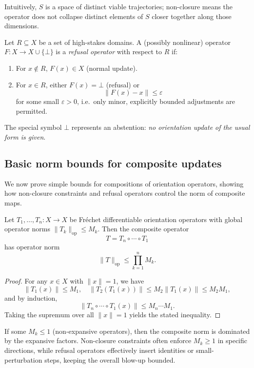 \documentclass[11pt]{article}
\begin{document}
Intuitively, \(S\) is a space of distinct viable trajectories; non-closure means the operator does not collapse distinct elements of \(S\) closer together along those dimensions.

\begin{definition}
Let \(R \subseteq X\) be a set of high-stakes domains. A (possibly nonlinear) operator \(F : X \to X \cup \{\bot\}\) is a \emph{refusal operator} with respect to \(R\) if:
\begin{enumerate}
  \item For \(x \notin R\), \(F(x) \in X\) (normal update).
  \item For \(x \in R\), either \(F(x) = \bot\) (refusal) or
  \[
  \|F(x) - x\| \le \varepsilon
  \]
  for some small \(\varepsilon > 0\), i.e.\ only minor, explicitly bounded adjustments are permitted.
\end{enumerate}
\end{definition}

The special symbol \(\bot\) represents an abstention: \emph{no orientation update of the usual form is given}.

\subsection{Basic norm bounds for composite updates}

We now prove simple bounds for compositions of orientation operators, showing how non-closure constraints and refusal operators control the norm of composite maps.

\begin{proposition}
Let \(T_1,\dots,T_n : X \to X\) be Fréchet differentiable orientation operators with global operator norms \(\|T_k\|_{\mathrm{op}} \le M_k\). Then the composite operator
\[
T = T_n \circ \cdots \circ T_1
\]
has operator norm
\[
\|T\|_{\mathrm{op}} \le \prod_{k=1}^n M_k.
\]
\end{proposition}

\begin{proof}
For any \(x \in X\) with \(\|x\| = 1\), we have
\[
\|T_1(x)\| \le M_1,\quad \|T_2(T_1(x))\| \le M_2 \|T_1(x)\| \le M_2 M_1,
\]
and by induction,
\[
\|T_n \circ \cdots \circ T_1(x)\| \le M_n \cdots M_1.
\]
Taking the supremum over all \(\|x\| = 1\) yields the stated inequality.
\end{proof}

If some \(M_k \le 1\) (non-expansive operators), then the composite norm is dominated by the expansive factors. Non-closure constraints often enforce \(M_k \ge 1\) in specific directions, while refusal operators effectively insert identities or small-perturbation steps, keeping the overall blow-up bounded.
\end{document}
